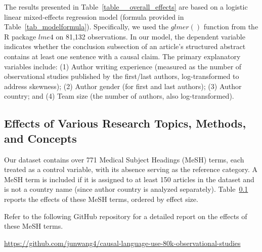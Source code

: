 \begin{appendices}
The results presented in Table~\ref{table__overall_effects} are based on a
logistic linear mixed-effects regression model (formula provided in
Table~\ref{tab_modelformula}). Specifically, we used the $glmer()$ function from
the R package $lme4$ \citep{Bates2014FittingLM} on 81,132 observations. In our
model, the dependent variable indicates whether the conclusion subsection of an
article's structured abstract contains at least one sentence with a causal
claim. The primary explanatory variables include: (1) Author writing experience
(measured as the number of observational studies published by the first/last
authors, log-transformed to address skewness); (2) Author gender (for first and
last authors); (3) Author country; and (4) Team size (the number of authors,
also log-transformed).



\subsection{Effects of Various Research Topics, Methods, and Concepts} \label{meshtermeffect}

Our dataset contains over 771 Medical Subject Headings (MeSH) terms, each
treated as a control variable, with its absence serving as the reference
category. A MeSH term is included if it is assigned to at least 150 articles in
the dataset and is not a country name (since author country is analyzed
separately). Table~\ref{meshtermeffect} reports the effects of these MeSH terms,
ordered by effect size.

Refer to the following GitHub repository for a detailed report on the effects of
these MeSH terms.

\noindent\href{https://github.com/junwang4/causal-language-use-80k-observational-studies/blob/main/pdf/meshterm_effects.pdf}{https://github.com/junwang4/causal-language-use-80k-observational-studies}

\end{appendices}